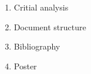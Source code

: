 \documentclass[11pt]{article} %
\begin{document}
\begin{enumerate}
	\item Critial analysis 
	\item Document structure
	\item Bibliography
	\item Poster 
\end{enumerate}

\nocite{*} 							%
\end{document}
